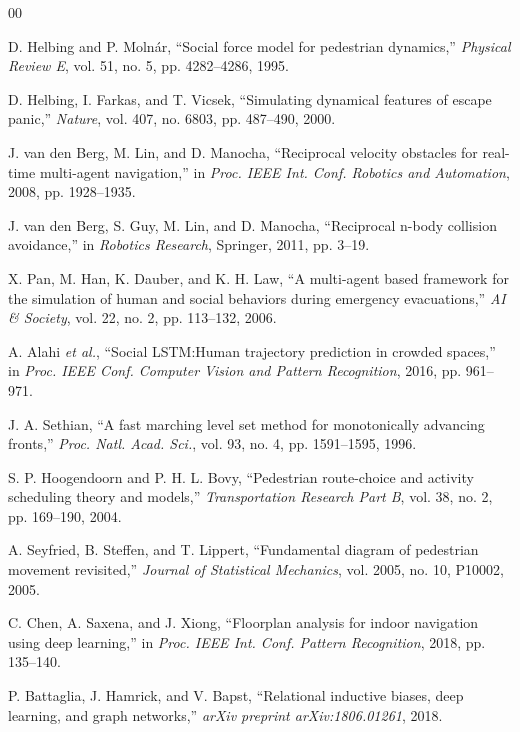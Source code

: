 \documentclass[conference]{IEEEtran}
\begin{document}
\begin{thebibliography}{00}

    D. Helbing and P. Molnár, ``Social force model for pedestrian dynamics,''
    \emph{Physical Review E}, vol. 51, no. 5, pp. 4282--4286, 1995.

    D. Helbing, I. Farkas, and T. Vicsek, ``Simulating dynamical features of escape
    panic,'' \emph{Nature}, vol. 407, no. 6803, pp. 487--490, 2000.

    J. van den Berg, M. Lin, and D. Manocha, ``Reciprocal velocity obstacles for
    real-time multi-agent navigation,'' in \emph{Proc. IEEE Int. Conf. Robotics and
        Automation}, 2008, pp. 1928--1935.

    J. van den Berg, S. Guy, M. Lin, and D. Manocha, ``Reciprocal n-body collision
    avoidance,'' in \emph{Robotics Research}, Springer, 2011, pp. 3--19.

    X. Pan, M. Han, K. Dauber, and K. H. Law, ``A multi-agent based framework for the
    simulation of human and social behaviors during emergency evacuations,''
    \emph{AI \& Society}, vol. 22, no. 2, pp. 113--132, 2006.

    A. Alahi \emph{et al.}, ``Social LSTM:\@ Human trajectory prediction in crowded
    spaces,'' in \emph{Proc. IEEE Conf. Computer Vision and Pattern Recognition},
    2016, pp. 961--971.

    J. A. Sethian, ``A fast marching level set method for monotonically advancing
    fronts,'' \emph{Proc. Natl. Acad. Sci.}, vol. 93, no. 4, pp. 1591--1595, 1996.

    S. P. Hoogendoorn and P. H. L. Bovy, ``Pedestrian route-choice and activity
    scheduling theory and models,'' \emph{Transportation Research Part B},
    vol. 38, no. 2, pp. 169--190, 2004.

    A. Seyfried, B. Steffen, and T. Lippert, ``Fundamental diagram of pedestrian
    movement revisited,'' \emph{Journal of Statistical Mechanics}, vol. 2005,
    no. 10, P10002, 2005.

    C. Chen, A. Saxena, and J. Xiong, ``Floorplan analysis for indoor navigation
    using deep learning,'' in \emph{Proc. IEEE Int. Conf. Pattern Recognition},
    2018, pp. 135--140.

    P. Battaglia, J. Hamrick, and V. Bapst, ``Relational inductive biases, deep
    learning, and graph networks,'' \emph{arXiv preprint arXiv:1806.01261}, 2018.

\end{thebibliography}

\vspace{12pt}
\end{document}
